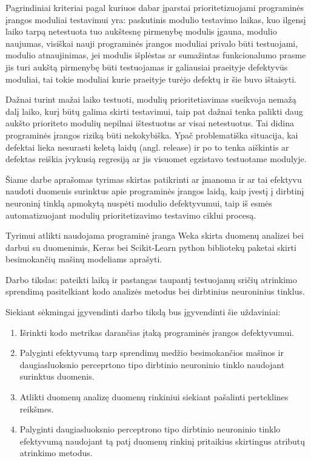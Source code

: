 \documentclass{VUMIFPSbakalaurinis}
\begin{document}
Pagrindiniai kriteriai pagal kuriuos dabar įparstai prioritetizuojami programinės įrangos moduliai testavimui yra: paskutinis modulio testavimo laikas, kuo ilgensį laiko tarpą netestuota tuo aukštesnę pirmenybę modulis įgauna, modulio naujumas, visiškai nauji programinės įrangos moduliai privalo būti testuojami, modulio atnaujinimas, jei modulis išplėstas ar sumažintas funkcionalumo prasme jis turi aukštą pirmenybę būti testuojamas ir galiausiai praeityje defektyvūs moduliai, tai tokie moduliai kurie praeityje turėjo defektų ir šie buvo ištaisyti.

Dažnai turint mažai laiko testuoti, modulių prioritetiavimas sueikvoja nemažą dalį laiko, kurį būtų galima skirti testavimui, taip pat dažnai tenka palikti daug aukšto prioriteto modulių nepilnai ištestuotus ar visai netestuotus. Tai didina programinės įrangos riziką būti nekokybiška. Ypač problematiška situacija, kai defektai lieka nesurasti keletą laidų (angl. release) ir po to tenka aiškintis ar defektas reiškia įvykusią regresiją ar jis visuomet egzistavo testuotame modulyje.

Šiame darbe aprašomas tyrimas skirtas patikrinti ar įmanoma ir ar tai efektyvu naudoti duomenis surinktus apie programinės įrangos laidą, kaip įvestį į dirbtinį neuroninį tinklą apmokytą nuspėti modulio defektyvumui, taip iš esmės automatizuojant modulių prioritetizavimo testavimo ciklui procesą.

Tyrimui atlikti naudojama programinė įranga Weka skirta duomenų analizei bei darbui su duomenimis, Keras bei Scikit-Learn python bibliotekų paketai skirti besimokančių mašinų modeliams aprašyti.

Darbo tikslas: pateikti laiką ir pastangas taupantį testuojamų sričių atrinkimo sprendimą pasitelkiant kodo analizės metodus bei dirbtinius neuroninius tinklus.

Siekiant sėkmingai įgyvendinti darbo tikslą bus įgyvendinti šie uždaviniai:
\begin{enumerate}
\item Išrinkti kodo metrikas darančias įtaką programinės įrangos defektyvumui.
\item Palyginti efektyvumą tarp sprendimų medžio besimokančios mašinos ir daugiasluoksnio perceprtono tipo dirbtinio neuroninio tinklo naudojant surinktus duomenis.
\item Atlikti duomenų analizę duomenų rinkiniui siekiant pašalinti perteklines reikšmes.
\item Palyginti daugiasluoksnio perceptrono tipo dirbtinio neuroninio tinklo efektyvumą naudojant tą patį duomenų rinkinį pritaikius skirtingus atributų atrinkimo metodus.
\end{enumerate}
\end{document}
